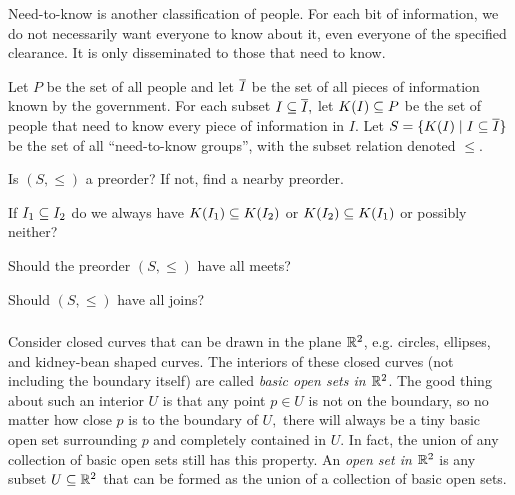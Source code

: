 \documentclass[../main/CT4S-EN-RU]{subfiles}
\begin{document}
\begin{blockENG}
Need-to-know is another classification of people. For each bit of information, we do not necessarily want everyone to know about it, even everyone of the specified clearance. It is only disseminated to those that need to know. 
\end{blockENG}

\begin{blockRUS}
\end{blockRUS}

\begin{exerciseENG}
Let $P$ be the set of all people and let $\ol{I}$ be the set of all pieces of information known by the government. For each subset $I\ss\ol{I},$ let $K(I)\ss P$ be the set of people that need to know every piece of information in $I.$ Let $S=\{K(I)\|I\ss\ol{I}\}$ be the set of all “need-to-know groups”, with the subset relation denoted $\leq.$ 

\sexc Is $(S,\leq)$ a preorder? If not, find a nearby preorder. 
\item If $I_1\ss I_2$ do we always have $K(I_1)\ss K(I_2)$ or $K(I_2)\ss K(I_1)$ or possibly neither? 
\item Should the preorder $(S,\leq)$ have all meets? 
\item Should $(S,\leq)$ have all joins?
\endsexc
\end{exerciseENG}

\begin{exerciseRUS}
\end{exerciseRUS}


\subsubsection{}

\begin{blockENG}
Consider closed curves that can be drawn in the plane $\RR^2$, e.g. circles, ellipses, and kidney-bean shaped curves. The interiors of these closed curves (not including the boundary itself) are called {\em basic open sets in $\RR^2$}. The good thing about such an interior $U$ is that any point $p\in U$ is not on the boundary, so no matter how close $p$ is to the boundary of $U,$ there will always be a tiny basic open set surrounding $p$ and completely contained in $U.$ In fact, the union of any collection of basic open sets still has this property. An {\em open set in $\RR^2$} is any subset $U\ss \RR^2$ that can be formed as the union of a collection of basic open sets.
\end{blockENG}
\end{document}
